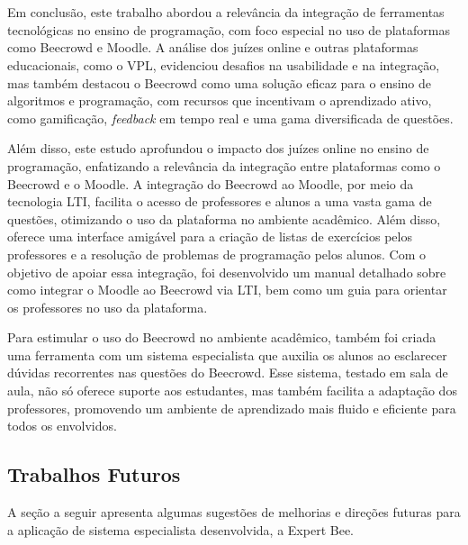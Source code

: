 

\chapter{}

Em conclusão, este trabalho abordou a relevância da integração de ferramentas tecnológicas no ensino de programação, com foco especial no uso de plataformas como Beecrowd e Moodle. A análise dos juízes online e outras plataformas educacionais, como o VPL, evidenciou desafios na usabilidade e na integração, mas também destacou o Beecrowd como uma solução eficaz para o ensino de algoritmos e programação, com recursos que incentivam o aprendizado ativo, como gamificação, \textit{feedback} em tempo real e uma gama diversificada de questões.

Além disso, este estudo aprofundou o impacto dos juízes online no ensino de programação, enfatizando a relevância da integração entre plataformas como o Beecrowd e o Moodle. A integração do Beecrowd ao Moodle, por meio da tecnologia LTI, facilita o acesso de professores e alunos a uma vasta gama de questões, otimizando o uso da plataforma no ambiente acadêmico. Além disso, oferece uma interface amigável para a criação de listas de exercícios pelos professores e a resolução de problemas de programação pelos alunos. Com o objetivo de apoiar essa integração, foi desenvolvido um manual detalhado sobre como integrar o Moodle ao Beecrowd via LTI, bem como um guia para orientar os professores no uso da plataforma.

Para estimular o uso do Beecrowd no ambiente acadêmico, também foi criada uma ferramenta com um sistema especialista que auxilia os alunos ao esclarecer dúvidas recorrentes nas questões do Beecrowd. Esse sistema, testado em sala de aula, não só oferece suporte aos estudantes, mas também facilita a adaptação dos professores, promovendo um ambiente de aprendizado mais fluido e eficiente para todos os envolvidos.

\section{Trabalhos Futuros}

A seção a seguir apresenta algumas sugestões de melhorias e direções futuras para a aplicação de sistema especialista desenvolvida, a Expert Bee. 


